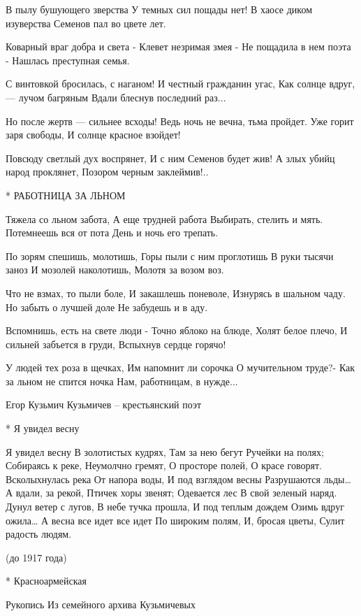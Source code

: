 В пылу бушующего зверства
     У темных сил пощады нет!
В хаосе диком изуверства
     Семенов пал во цвете лет.

Коварный враг добра и света -
     Клевет незримая змея -
Не пощадила в нем поэта -
     Нашлась преступная семья.

С винтовкой бросилась, с наганом!
И честный гражданин угас,
Как солнце вдруг, — лучом багряным
Вдали блеснув последний раз...

Но после жертв — сильнее всходы!
Ведь ночь не вечна, тьма пройдет.
Уже горит заря свободы,
И солнце красное взойдет!

Повсюду светлый дух воспрянет,
И с ним Семенов будет жив!
А злых убийц народ проклянет,
Позором черным заклеймив!..


* РАБОТНИЦА ЗА ЛЬНОМ

Тяжела со льном забота,
А еще трудней работа
          Выбирать, стелить и мять.
Потемнеешь вся от пота
          День и ночь его трепать.

По зорям спешишь, молотишь,
Горы пыли с ним проглотишь
          В руки тысячи заноз
И мозолей наколотишь,
          Молотя за возом воз.

Что не взмах, то пыли боле,
И закашлешь поневоле,
          Изнурясь в шальном чаду.
Но забыть о лучшей доле
          Не забудешь и в аду.

Вспомнишь, есть на свете люди -
Точно яблоко на блюде,
          Холят белое плечо,
И сильней забъется в груди,
          Вспыхнув сердце горячо!

У людей тех роза в щечках,
Им напомнит ли сорочка
          О мучительном труде?-
Как за льном не спится ночка
          Нам, работницам, в нужде...

Егор Кузьмич Кузьмичев – крестьянский поэт


* Я увидел весну

Я увидел весну
     В золотистых кудрях,
Там за нею бегут
     Ручейки на полях;
Собираясь к реке,
     Неумолчно гремят,
О просторе полей,
     О красе говорят.
Всколыхнулась река
     От напора воды,
И под взглядом весны
     Разрушаются льды…
А вдали, за рекой,
     Птичек хоры звенят;
Одевается лес
     В свой зеленый наряд.
Дунул ветер с лугов,
     В небе тучка прошла,
И под теплым дождем
     Озимь вдруг ожила…
А весна все идет все идет
     По широким полям,
И, бросая цветы,
     Сулит радость людям.

(до 1917 года)


* Красноармейская

Рукопись
Из семейного архива Кузьмичевых

